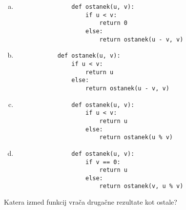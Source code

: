 \documentclass[arhiv, 10pt]{../izpit}
\begin{document}
        \begin{multicols}{2}
        \begin{enumerate}[(a)]
\item 
                \begin{verbatim}
                def ostanek(u, v):
                    if u < v:
                        return 0
                    else:
                        return ostanek(u - v, v)
                \end{verbatim}
            
\item 
            \begin{verbatim}
            def ostanek(u, v):
                if u < v:
                    return u
                else:
                    return ostanek(u - v, v)
            \end{verbatim}
        
\item 
                \begin{verbatim}
                def ostanek(u, v):
                    if u < v:
                        return u
                    else:
                        return ostanek(u % v)
                \end{verbatim}
            
\item 
                \begin{verbatim}
                def ostanek(u, v):
                    if v == 0:
                        return u
                    else:
                        return ostanek(v, u % v)
                \end{verbatim}
            
\end{enumerate}

        \end{multicols}
    
        \naloga*
        
        Katera izmed funkcij vrača drugačne rezultate kot ostale?
    
\end{document}
